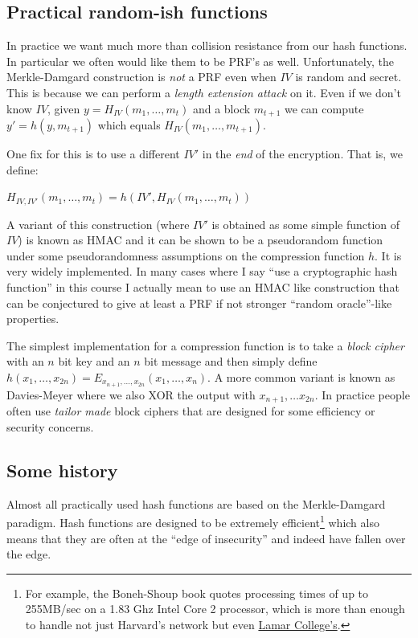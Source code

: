 \subsection{Practical random-ish
functions}\label{Practical-random-ish-func}

In practice we want much more than collision resistance from our hash
functions. In particular we often would like them to be PRF's as well.
Unfortunately, the Merkle-Damgard construction is \emph{not} a PRF even
when \(\ensuremath{\mathit{IV}}\) is random and secret. This is because
we can perform a \emph{length extension attack} on it. Even if we don't
know \(\ensuremath{\mathit{IV}}\), given \(y=H_{IV}(m_1,\ldots,m_t)\)
and a block \(m_{t+1}\) we can compute \(y' = h(y,m_{t+1})\) which
equals \(H_{IV}(m_1,\ldots,m_{t+1})\).

One fix for this is to use a different \(\ensuremath{\mathit{IV}}'\) in
the \emph{end} of the encryption. That is, we define:

\(H_{IV,\ensuremath{\mathit{IV}}'}(m_1,\ldots,m_t) = h(\ensuremath{\mathit{IV}}',H_{IV}(m_1,\ldots,m_t))\)

A variant of this construction (where \(\ensuremath{\mathit{IV}}'\) is
obtained as some simple function of \(\ensuremath{\mathit{IV}}\)) is
known as HMAC and it can be shown to be a pseudorandom function under
some pseudorandomness assumptions on the compression function \(h\). It
is very widely implemented. In many cases where I say ``use a
cryptographic hash function'' in this course I actually mean to use an
HMAC like construction that can be conjectured to give at least a PRF if
not stronger ``random oracle''-like properties.

The simplest implementation for a compression function is to take a
\emph{block cipher} with an \(n\) bit key and an \(n\) bit message and
then simply define
\(h(x_1,\ldots,x_{2n})=E_{x_{n+1},\ldots,x_{2n}}(x_{1},\ldots,x_{n})\).
A more common variant is known as Davies-Meyer where we also XOR the
output with \(x_{n+1},\ldots x_{2n}\). In practice people often use
\emph{tailor made} block ciphers that are designed for some efficiency
or security concerns.

\subsection{Some history}\label{Some-history}

Almost all practically used hash functions are based on the
Merkle-Damgard paradigm. Hash functions are designed to be extremely
efficient\footnote{For example, the Boneh-Shoup book quotes processing
  times of up to 255MB/sec on a 1.83 Ghz Intel Core 2 processor, which
  is more than enough to handle not just Harvard's network but even
  \href{http://www.huffingtonpost.com/2014/06/27/colleges-fastest-internet-speed-infographic_n_5536834.html}{Lamar
  College's}.} which also means that they are often at the ``edge of
insecurity'' and indeed have fallen over the edge.

